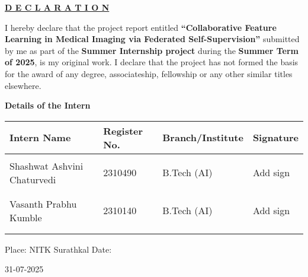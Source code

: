 \documentclass[a4paper, 10 pt, conference]{ieeeconf}
\begin{document}

\newpage
\vspace{3em}

{\large

\begin{center}
\Large{\textbf{\underline{D E C L A R A T I O N}}}\\
\end{center}

\vspace{2em}
I hereby declare that the project report entitled {\color{red}\textbf{``Collaborative Feature Learning in Medical
Imaging via Federated Self-Supervision''}} submitted by me as part of the {\textbf{Summer Internship project}} during the {\textbf{Summer Term of 2025}}, is my original work.  I declare that the project has not formed the basis for the award of any degree, associateship, fellowship or any other similar titles elsewhere.\\

\vspace{2em}

{\large\textbf{Details of the Intern}} \\ %

\begin{center}
\begin{tabular}{ m{5.3cm}  m{3cm} m{4cm}  m{1.7cm}}
\hline
Intern Name & Register No. & Branch/Institute  & Signature	\\ \hline
\\
{\color{red}Shashwat Ashvini Chaturvedi }		&  {\color{red}2310490}		&  {\color{red}B.Tech (AI)}	 &  {\color{red}Add sign}						\\\\\\
{\color{red}Vasanth Prabhu Kumble}		&  {\color{red}2310140}		&  {\color{red}B.Tech (AI)}	 &  {\color{red}Add sign}						\\\\\\
\hline
\end{tabular} 
\end{center} 

\vspace{2em}
\noindent
Place: NITK Surathkal
\newline
Date: \date{} {\color{red}31-07-2025}

}
\end{document}
